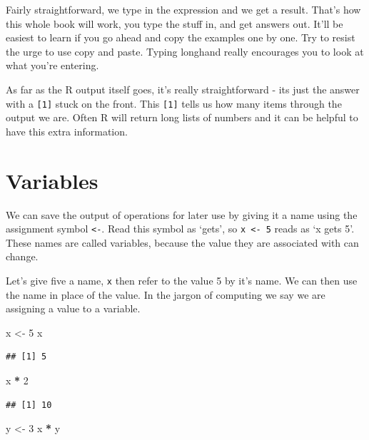 \documentclass[
]{book}
\newenvironment{Shaded}{\begin{snugshade}}{\end{snugshade}}
\newcommand{\DecValTok}[1]{\textcolor[rgb]{0.00,0.00,0.81}{#1}}
\newcommand{\NormalTok}[1]{#1}
\newcommand{\OperatorTok}[1]{\textcolor[rgb]{0.81,0.36,0.00}{\textbf{#1}}}
\newcommand{\StringTok}[1]{\textcolor[rgb]{0.31,0.60,0.02}{#1}}
\begin{document}
Fairly straightforward, we type in the expression and we get a result. That's how this whole book will work, you type the stuff in, and get answers out. It'll be easiest to learn if you go ahead and copy the examples one by one. Try to resist the urge to use copy and paste. Typing longhand really encourages you to look at what you're entering.

As far as the R output itself goes, it's really straightforward - its just the answer with a \texttt{{[}1{]}} stuck on the front. This \texttt{{[}1{]}} tells us how many items through the output we are. Often R will return long lists of numbers and it can be helpful to have this extra information.

\hypertarget{variables}{%
\section{Variables}\label{variables}}

We can save the output of operations for later use by giving it a name using the assignment symbol \texttt{\textless{}-}. Read this symbol as `gets', so \texttt{x\ \textless{}-\ 5} reads as `x gets 5'. These names are called variables, because the value they are associated with can change.

Let's give five a name, \texttt{x} then refer to the value 5 by it's name. We can then use the name in place of the value. In the jargon of computing we say we are assigning a value to a variable.

\begin{Shaded}
\begin{Highlighting}[]
\NormalTok{ x <-}\StringTok{ }\DecValTok{5}
\NormalTok{ x}
\end{Highlighting}
\end{Shaded}

\begin{verbatim}
## [1] 5
\end{verbatim}

\begin{Shaded}
\begin{Highlighting}[]
\NormalTok{ x }\OperatorTok{*}\StringTok{ }\DecValTok{2}
\end{Highlighting}
\end{Shaded}

\begin{verbatim}
## [1] 10
\end{verbatim}

\begin{Shaded}
\begin{Highlighting}[]
\NormalTok{y <-}\StringTok{ }\DecValTok{3}
\NormalTok{x }\OperatorTok{*}\StringTok{ }\NormalTok{y}
\end{Highlighting}
\end{Shaded}
\end{document}
